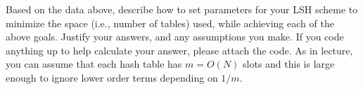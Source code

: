 \documentclass[10pt]{article}
\begin{document}
\noindent Based on the data above, describe how to set parameters for your LSH scheme to minimize the space (i.e., number of tables) used, while achieving each of the above goals. Justify your answers, and any assumptions you make.
If you code anything up to help calculate your answer, please attach the code. As in lecture, you can assume that each hash table has $m = O(N)$ slots and this is large enough to ignore lower order terms depending on $1/m$. 





\end{document}

